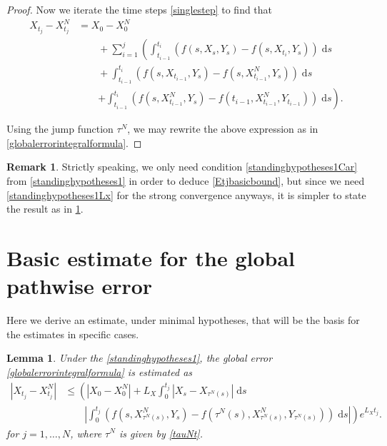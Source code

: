 \documentclass[reqno,12pt]{amsart}
\theoremstyle{plain}%
\newtheorem{lem}{Lemma}[section]
\theoremstyle{definition}
\newtheorem{rmk}{Remark}[section]
\begin{document}
\begin{proof}
    Now we iterate the time steps \eqref{singlestep} to find that
    \begin{align*}
        X_{t_j} - X_{t_j}^N & = X_0 - X_0^N \\
        & \qquad + \sum_{i=1}^{j} \left(\int_{t_{i-1}}^{t_i} \left( f(s, X_s, Y_s) - f(s, X_{t_{i}}, Y_s) \right)\;\mathrm{d}s \right. \\ 
        & \qquad + \int_{t_{i-1}}^{t_i} \left( f(s, X_{t_{i-1}}, Y_s) - f(s, X_{t_{i-1}}^N, Y_s) \right)\;\mathrm{d}s \\
        & \qquad \left. + \int_{t_{i-1}}^{t_i} \left( f(s, X_{t_{i-1}}^N, Y_s) - f(t_{i-1}, X_{t_{i-1}}^N, Y_{t_{i-1}}) \right)\;\mathrm{d}s \right).
    \end{align*}

    Using the jump function $\tau^N$, we may rewrite the above expression as in \eqref{globalerrorintegralformula}.
\end{proof}

\begin{rmk}
    Strictly speaking, we only need condition \eqref{standinghypotheses1Car} from \cref{standinghypotheses1} in order to deduce \eqref{Etjbasicbound}, but since we need \eqref{standinghypotheses1Lx} for the strong convergence anyways, it is simpler to state the result as in \cref{lembasicestimate}.
\end{rmk}

\section{Basic estimate for the global pathwise error}

Here we derive an estimate, under minimal hypotheses, that will be the basis for the estimates in specific cases.

\begin{lem}
    \label{lembasicestimate}
    Under the \cref{standinghypotheses1}, the global error \eqref{globalerrorintegralformula} is estimated as
    \begin{equation}
        \label{Etjbasicbound}
        \begin{aligned}
            |X_{t_j} - X_{t_j}^N| & \leq \left( |X_0 - X_0^N| + L_X \int_0^{t_j} |X_s - X_{\tau^N(s)}| \;\mathrm{d}s \right. \\
            & \qquad \left. \left|\int_0^{t_j} \left( f(s, X_{\tau^N(s)}^N, Y_s) - f(\tau^N(s), X_{\tau^N(s)}^N, Y_{\tau^N(s)}) \right)\;\mathrm{d}s\right|\right) e^{L_X t_j}.
        \end{aligned}
    \end{equation}
    for $j=1, \ldots, N$, where $\tau^N$ is given by \eqref{tauNt}.
\end{lem}
\end{document}
